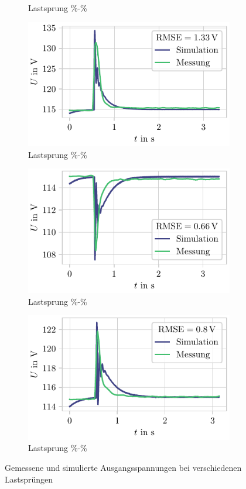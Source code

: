 \begin{figure}
\begin{subfigure}{.49\textwidth}
	\caption{Lastsprung \unit[0]{\%}-\unit[100]{\%}}
	\label{fig:ValMessung0-100}
\end{subfigure}
\begin{subfigure}{.49\textwidth}
	\centering
	\includegraphics[]{Bilder/ValMessung_100-0.pdf}
	\caption{Lastsprung \unit[100]{\%}-\unit[0]{\%}}
	\label{fig:ValMessung100-0}
\end{subfigure}
\begin{subfigure}{.49\textwidth}
	\centering
	\includegraphics[]{Bilder/ValMessung_50-100.pdf}
	\caption{Lastsprung \unit[50]{\%}-\unit[100]{\%}}
	\label{fig:ValMessung50-100}
\end{subfigure}
\begin{subfigure}{.49\textwidth}
	\centering
	\includegraphics[]{Bilder/ValMessung_100-50.pdf}
	\caption{Lastsprung \unit[100]{\%}-\unit[50]{\%}}
	\label{fig:ValMessung100-50}
\end{subfigure}
\caption{Gemessene und simulierte Ausgangsspannungen bei verschiedenen Lastsprüngen}
\label{fig:ValSpannung}
\end{figure}